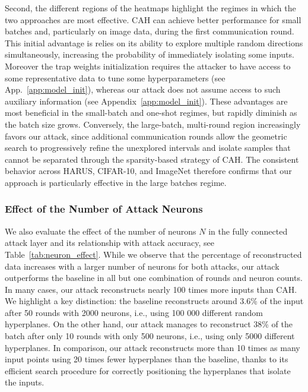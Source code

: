 Second, the different regions of the heatmaps highlight the regimes in which the two approaches are most effective. CAH can achieve better performance for small batches and, particularly on image data, during the first communication round. This initial advantage is relies on its ability to explore multiple random directions simultaneously, increasing the probability of immediately isolating some inputs. Moreover the trap weights initialization requires the attacker to have access to some representative data to tune some hyperparameters (see App.~\ref{app:model_init}), whereas our attack does not assume access to such auxiliary information (see Appendix~\ref{app:model_init}). These advantages are most beneficial in the small-batch and one-shot regimes, but rapidly diminish as the batch size grows. Conversely, the large-batch, multi-round region increasingly favors our attack, since additional communication rounds allow the geometric search to progressively refine the unexplored intervals and isolate samples that cannot be separated through the sparsity-based strategy of CAH. The consistent behavior across HARUS, CIFAR-10, and ImageNet therefore confirms that our approach is particularly effective in the large batches regime.

\subsubsection{Effect of the Number of Attack Neurons}

We also evaluate the effect of the number of neurons $N$ in the fully connected attack layer and its relationship with attack accuracy, see Table~\ref{tab:neuron_effect}.
While we observe that the percentage of reconstructed data increases with a larger number of neurons for both attacks, our attack outperforms the baseline in all but one combination of rounds and neuron counts. In many cases, our attack reconstructs nearly 100 times more inputs than CAH. We highlight a key distinction: the baseline reconstructs around 3.6\% of the input after 50 rounds with 2000 neurons, i.e., using 100 000 different random hyperplanes.
On the other hand, our attack manages to reconstruct 38\% of the batch after only 10 rounds with only 500 neurons, i.e., using only 5000 different hyperplanes.
In comparison, our attack reconstructs more than 10 times as many input points using 20 times fewer hyperplanes than the baseline,  thanks to its efficient search procedure for correctly positioning the hyperplanes that isolate the inputs.


